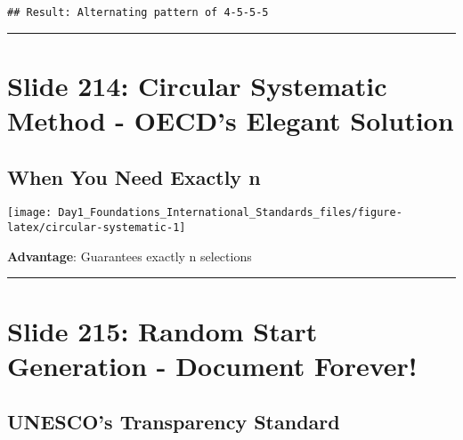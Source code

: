 \documentclass[
]{article}
\begin{document}
\begin{verbatim}
## Result: Alternating pattern of 4-5-5-5
\end{verbatim}

\begin{center}\rule{0.5\linewidth}{0.5pt}\end{center}

\section{Slide 214: Circular Systematic Method - OECD's Elegant
Solution}\label{slide-214-circular-systematic-method---oecds-elegant-solution}

\subsection{When You Need Exactly n}\label{when-you-need-exactly-n}

\texttt{[image: Day1\_Foundations\_International\_Standards\_files/figure-latex/circular-systematic-1]}

\textbf{Advantage}: Guarantees exactly n selections

\begin{center}\rule{0.5\linewidth}{0.5pt}\end{center}

\section{Slide 215: Random Start Generation - Document
Forever!}\label{slide-215-random-start-generation---document-forever}

\subsection{UNESCO's Transparency
Standard}\label{unescos-transparency-standard}
\end{document}

